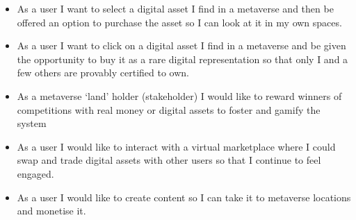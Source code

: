 \begin{itemize}
\item As a user I want to select a digital asset I find in a metaverse and then be offered an option to purchase the asset so I can look at it in my own spaces.
\item As a user I want to click on a digital asset I find in a metaverse and be given the opportunity to buy it as a rare digital representation so that only I and a few others are provably certified to own.
\item As a metaverse `land' holder (stakeholder) I would like to reward winners of competitions with real money or digital assets to foster and gamify the system
\item As a user I would like to interact with a virtual marketplace where I could swap and trade digital assets with other users so that I continue to feel engaged.
\item As a user I would like to create content so I can take it to metaverse locations and monetise it.
\end{itemize}

